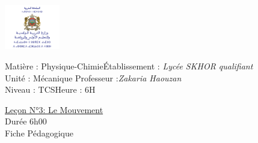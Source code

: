 \documentclass[14pt]{article}
\newcommand\headerMe[2]{\noindent{}#1\hfill#2}
\begin{document}
\begin{center}
\includegraphics[width = 0.18\textwidth]{./img/logoMin.png}
\vspace{-3cm}
\end{center}
\headerMe{Matière : Physique-Chimie}{Établissement : \emph{Lycée SKHOR qualifiant}}\\
\headerMe{ Unité :  Mécanique}{  Professeur :\emph{Zakaria Haouzan}}\\
\headerMe{Niveau : TCS}{Heure : 6H}\\

\begin{center}
	\vspace{1cm}
\underline{Leçon N°3:  Le Mouvement}\\
Durée 6h00
\\
    \vspace{.2cm}
\hrulefill
\Large{Fiche Pédagogique}
\hrulefill\\
\end{center}
\end{document}
